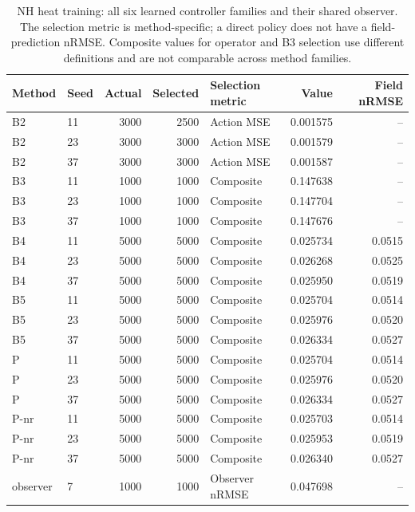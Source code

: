 \begin{table}[ht]
\centering\small
\caption{NH heat training: all six learned controller families and their shared observer. The selection metric is method-specific; a direct policy does not have a field-prediction nRMSE. Composite values for operator and B3 selection use different definitions and are not comparable across method families.}\label{tab:new_heat_selection}
\begin{tabular}{@{}llrrlrr@{}}\toprule
Method & Seed & Actual & Selected & Selection metric & Value & Field nRMSE\\\midrule
B2 & 11 & 3000 & 2500 & Action MSE & 0.001575 & --\\
B2 & 23 & 3000 & 3000 & Action MSE & 0.001579 & --\\
B2 & 37 & 3000 & 3000 & Action MSE & 0.001587 & --\\
B3 & 11 & 1000 & 1000 & Composite & 0.147638 & --\\
B3 & 23 & 1000 & 1000 & Composite & 0.147704 & --\\
B3 & 37 & 1000 & 1000 & Composite & 0.147676 & --\\
B4 & 11 & 5000 & 5000 & Composite & 0.025734 & 0.0515\\
B4 & 23 & 5000 & 5000 & Composite & 0.026268 & 0.0525\\
B4 & 37 & 5000 & 5000 & Composite & 0.025950 & 0.0519\\
B5 & 11 & 5000 & 5000 & Composite & 0.025704 & 0.0514\\
B5 & 23 & 5000 & 5000 & Composite & 0.025976 & 0.0520\\
B5 & 37 & 5000 & 5000 & Composite & 0.026334 & 0.0527\\
P & 11 & 5000 & 5000 & Composite & 0.025704 & 0.0514\\
P & 23 & 5000 & 5000 & Composite & 0.025976 & 0.0520\\
P & 37 & 5000 & 5000 & Composite & 0.026334 & 0.0527\\
P-nr & 11 & 5000 & 5000 & Composite & 0.025703 & 0.0514\\
P-nr & 23 & 5000 & 5000 & Composite & 0.025953 & 0.0519\\
P-nr & 37 & 5000 & 5000 & Composite & 0.026340 & 0.0527\\
observer & 7 & 1000 & 1000 & Observer nRMSE & 0.047698 & --\\
\bottomrule\end{tabular}
\end{table}
